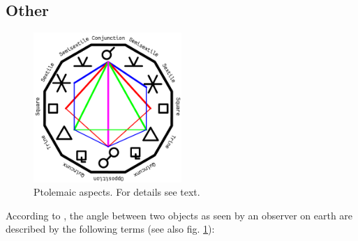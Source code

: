 \documentclass[british,final,landscape]{scrartcl}
\begin{document}
\begin{refsection}
\subsection{Other}

\begin{figure}
 \caption{\capstart Ptolemaic aspects. For details see text. }
 \label{fig:Aspect}
 \centering
 \includegraphics[width=0.5\textwidth]{Astrology/Aspect}
\end{figure}

According to  \parencite{Pto-00}, the angle between two objects as seen by an observer on earth are described by the following terms (see also fig. \ref{fig:Aspect}):


\end{refsection}
\end{document}
